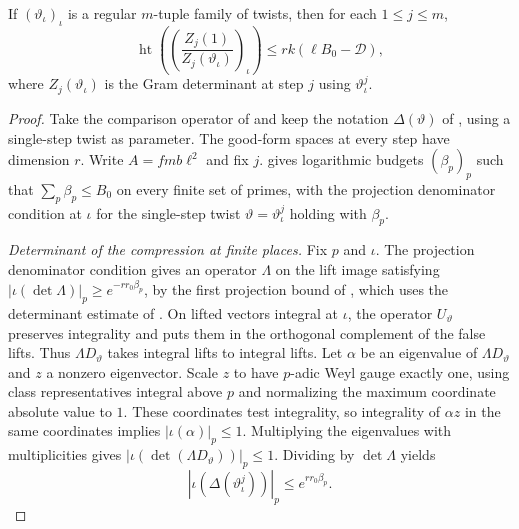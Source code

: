\begin{lemma}
\label{lem:c-single-volume-height}
\emitthmsource
If $(\vartheta_\iota)_\iota$ is a regular $m$-tuple family of twists, then for each $1\le j\le m$,
\begin{equation}
 \operatorname{ht}\left(\left(\frac{Z_j(1)}{Z_j(\vartheta_\iota)}\right)_\iota\right)
 \le rk(\ell B_0-\mathcal D),
\label{eq:c-single-volume}
\end{equation}
where $Z_j(\vartheta_\iota)$ is the Gram determinant at step $j$ using $\vartheta_\iota^j$.
\end{lemma}
\begin{proof}
Take the comparison operator of  and keep the notation $\Delta(\vartheta)$ of , using a single-step twist as parameter. The good-form spaces at every step have dimension $r$. Write $A=fmb\ell^2$ and fix $j$.  gives logarithmic budgets $(\beta_p)_p$ such that $\sum_p\beta_p\le B_0$ on every finite set of primes, with the projection denominator condition at $\iota$ for the single-step twist $\vartheta=\vartheta_\iota^j$ holding with $\beta_p$.

\emph{Determinant of the compression at finite places.}
Fix $p$ and $\iota$. The projection denominator condition gives an operator $\Lambda$ on the lift image satisfying $|\iota(\det\Lambda)|_p\ge e^{-rr_0\beta_p}$, by the first projection bound of , which uses the determinant estimate of . On lifted vectors integral at $\iota$, the operator $U_\vartheta$ preserves integrality and puts them in the orthogonal complement of the false lifts. Thus $\Lambda D_\vartheta$ takes integral lifts to integral lifts. Let $\alpha$ be an eigenvalue of $\Lambda D_\vartheta$ and $z$ a nonzero eigenvector. Scale $z$ to have $p$-adic Weyl gauge exactly one, using class representatives integral above $p$ and normalizing the maximum coordinate absolute value to $1$. These coordinates test integrality, so integrality of $\alpha z$ in the same coordinates implies $|\iota(\alpha)|_p\le1$. Multiplying the eigenvalues with multiplicities gives $|\iota(\det(\Lambda D_\vartheta))|_p\le1$. Dividing by $\det\Lambda$ yields
\[
 |\iota(\Delta(\vartheta_\iota^j))|_p\le e^{rr_0\beta_p}.
\]


\end{proof}

